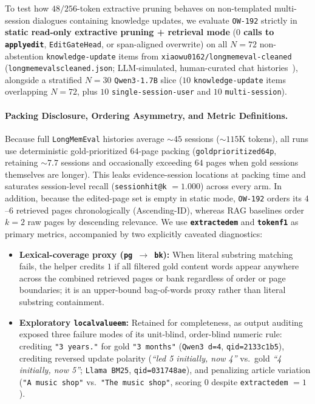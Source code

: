 \documentclass[10pt]{article}
\renewcommand{\_}{\origunderscore\allowbreak}
\begin{document}
To test how $48/256$-token extractive pruning behaves on non-templated multi-session dialogues containing knowledge updates, we evaluate \texttt{OW-192} strictly in \textbf{static read-only extractive pruning + retrieval mode} (\textbf{$0$ calls to \texttt{apply\_edit}}, \texttt{EditGateHead}, or span-aligned overwrite) on all $N=72$ non-abstention \texttt{knowledge-update} items from \texttt{xiaowu0162/\allowbreak longmemeval-cleaned} (\texttt{longmemeval\_s\_cleaned.json}; LLM-simulated, human-curated chat histories~\citep{wu2025longmemeval}), alongside a stratified $N=30$ \texttt{Qwen3-1.7B} slice ($10$ \texttt{knowledge-update} items overlapping $N=72$, plus $10$ \texttt{single-session-user} and $10$ \texttt{multi-session}).

\paragraph{Packing Disclosure, Ordering Asymmetry, and Metric Definitions.}
Because full \texttt{LongMemEval} histories average $\sim 45$ sessions ($\sim 115\text{K}$ tokens), all runs use deterministic gold-prioritized $64$-page packing (\texttt{gold\_prioritized\_64p}, retaining $\sim 7.7$ sessions and occasionally exceeding $64$ pages when gold sessions themselves are longer). This leaks evidence-session locations at packing time and saturates session-level recall (\texttt{session\_hit@k} $=1.000$) across every arm. In addition, because the edited-page set is empty in static mode, \texttt{OW-192} orders its $4$--$6$ retrieved pages chronologically (Ascending-ID), whereas RAG baselines order $k=2$ raw pages by descending relevance. We use \textbf{\texttt{extracted\_em}} and \textbf{\texttt{token\_f1}} as primary metrics, accompanied by two explicitly caveated diagnostics:
\begin{itemize}
    \item \textbf{Lexical-coverage proxy (\texttt{pg $\rightarrow$ bk}):} When literal substring matching fails, the helper credits $1$ if all filtered gold content words appear anywhere across the combined retrieved pages or bank regardless of order or page boundaries; it is an upper-bound bag-of-words proxy rather than literal substring containment.
    \item \textbf{Exploratory \texttt{local\_value\_em}:} Retained for completeness, as output auditing exposed three failure modes of its unit-blind, order-blind numeric rule: crediting \texttt{"3 years."} for gold \texttt{"3 months"} (\texttt{Qwen3 d=4}, \texttt{qid=2133c1b5}), crediting reversed update polarity (\emph{``led 5 initially, now 4''} vs.\ gold \emph{``4 initially, now 5''}; \texttt{Llama BM25}, \texttt{qid=031748ae}), and penalizing article variation (\texttt{"A music shop"} vs.\ \texttt{"The music shop"}, scoring $0$ despite \texttt{extracted\_em} $=1$).
\end{itemize}
\end{document}
